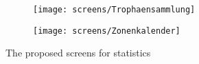 \begin{figure}[h]
	\centering
	\begin{subfigure}[b]{0.24\columnwidth}
		\centering
		\texttt{[image: screens/Trophaensammlung]}
		\label{fig:trophaen}
	\end{subfigure}
	\begin{subfigure}[b]{0.24\columnwidth}
		\centering
		\texttt{[image: screens/Zonenkalender]}
		\label{fig:zonen:optimizer}
	\end{subfigure}
	\caption{The proposed screens for statistics}
	\label{fig:kalender-} %
\end{figure}
